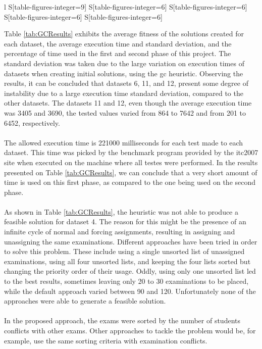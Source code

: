 \begin{table}[t]
\begin{tabular}{%
	 l%
     S[table-figures-integer=9]%
     S[table-figures-integer=6]%
     S[table-figures-integer=6]%
     S[table-figures-integer=6]%
     S[table-figures-integer=6]%
    }
\bottomrule

\end{tabular}
\label{tab:GCResults}

\end{table}Table \ref{tab:GCResults} exhibits the average fitness of the solutions created for each dataset, the average execution time and standard deviation, and the percentage of time used in the first and second phase of this project. The standard deviation was taken due to the large variation on execution times of datasets when creating initial solutions, using the \gls{gc} heuristic. Observing the results, it can be concluded that datasets 6, 11, and 12, present some degree of instability due to a large execution time standard deviation, compared to the other datasets. The datasets 11 and 12, even though the average execution time was 3405 and 3690, the tested values varied from 864 to 7642 and from 201 to 6452, respectively.\\
\\
The allowed execution time is 221000 milliseconds for each test made to each dataset. This time was picked by the benchmark program provided by the \gls{itc2007} site \cite{McCollum2007e} when executed on the machine where all testes were performed. In the results presented on Table \ref{tab:GCResults}, we can conclude that a very short amount of time is used on this first phase, as compared to the one being used on the second phase.\\
\\
As shown in Table \ref{tab:GCResults}, the heuristic was not able to produce a feasible solution for dataset 4. The reason for this might be the presence of an infinite cycle of normal and forcing assignments, resulting in assigning and unassigning the same examinations. Different approaches have been tried in order to solve this problem. These include using a single unsorted list of unassigned examinations, using all four unsorted lists, and keeping the four lists sorted but changing the priority order of their usage. Oddly, using only one unsorted list led to the best results, sometimes leaving only 20 to 30 examinations to be placed, while the default approach varied between 90 and 120. Unfortunately none of the approaches were able to generate a feasible solution.\\
\\
In the proposed approach, the exams were sorted by the number of students conflicts with other exams. Other approaches to tackle the problem would be, for example, use the same sorting criteria with examination conflicts.